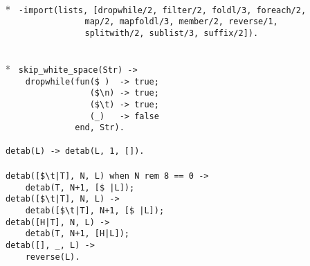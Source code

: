 \begin{flushleft}
\label{imports_start}
\\*
\tt
\noindent{}%
\verb&-import(lists, [dropwhile/2, filter/2, foldl/3, foreach/2, &\\
\noindent{}%
\verb&                map/2, mapfoldl/3, member/2, reverse/1, &\\
\noindent{}%
\verb&                splitwith/2, sublist/3, suffix/2]).&\\
\end{flushleft}

\begin{flushleft}
\label{utilities_4_8}
\\*
\tt
\noindent{}%
\verb&skip_white_space(Str) ->&\\
\noindent{}%
\verb&    dropwhile(fun($ )  -> true;&\\
\noindent{}%
\verb&                 ($\n) -> true;&\\
\noindent{}%
\verb&                 ($\t) -> true;&\\
\noindent{}%
\verb&                 (_)   -> false &\\
\noindent{}%
\verb&              end, Str).&\\
\noindent{}%
\verb&                  &\\
\noindent{}%
\verb&detab(L) -> detab(L, 1, []).&\\
\noindent{}%
\verb&&\\
\noindent{}%
\verb&detab([$\t|T], N, L) when N rem 8 == 0 -> &\\
\noindent{}%
\verb&    detab(T, N+1, [$ |L]);&\\
\noindent{}%
\verb&detab([$\t|T], N, L) -> &\\
\noindent{}%
\verb&    detab([$\t|T], N+1, [$ |L]);&\\
\noindent{}%
\verb&detab([H|T], N, L) ->&\\
\noindent{}%
\verb&    detab(T, N+1, [H|L]);&\\
\noindent{}%
\verb&detab([], _, L) ->&\\
\noindent{}%
\verb&    reverse(L).&\\
\noindent{}%
\verb&&\\
\end{flushleft}

